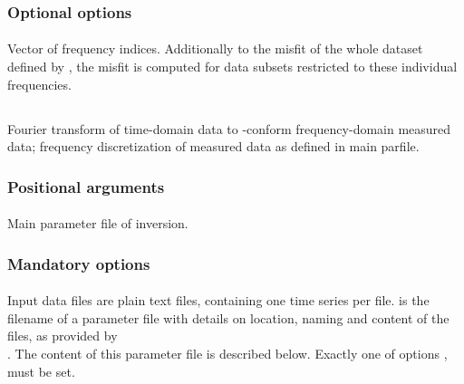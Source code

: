 \subsubsection{Optional options}
\paragraph{}
Vector of  frequency indices. Additionally to the misfit of the whole dataset defined by 
, the misfit is computed for data subsets restricted to these individual frequencies.
%
%
\subsection{} \label{programs_scripts,sec:bin_prog,sec:create_measured_data}
Fourier transform of time-domain data to \ASKI{}-conform frequency-domain measured data; frequency 
discretization of measured data as defined in main parfile.
\subsubsection{Positional arguments}
\paragraph{}
Main parameter file of inversion.
\subsubsection{Mandatory options}
\paragraph{}
Input data files are plain text files, containing one time series per file.  is the filename
of a parameter file with details on location, naming and content of the files, as provided by \\
 .
The content of this parameter file is described below.
Exactly one of options ,  must be set.
